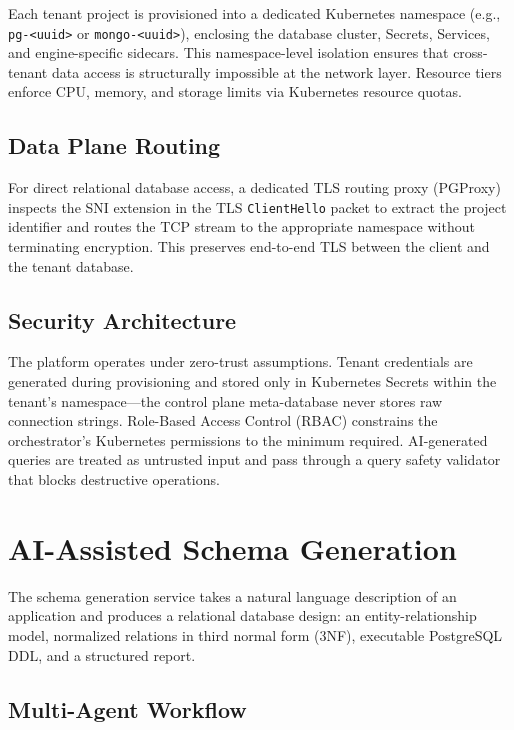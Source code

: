 \documentclass[twoside,twocolumn,10pt]{article}
\begin{document}
Each tenant project is provisioned into a dedicated Kubernetes namespace (e.g., \texttt{pg-<uuid>} or \texttt{mongo-<uuid>}), enclosing the database cluster, Secrets, Services, and engine-specific sidecars. This namespace-level isolation ensures that cross-tenant data access is structurally impossible at the network layer. Resource tiers enforce CPU, memory, and storage limits via Kubernetes resource quotas.

\subsection{Data Plane Routing}

For direct relational database access, a dedicated TLS routing proxy (PGProxy) inspects the SNI extension in the TLS \texttt{ClientHello} packet to extract the project identifier and routes the TCP stream to the appropriate namespace without terminating encryption. This preserves end-to-end TLS between the client and the tenant database.

\subsection{Security Architecture}

The platform operates under zero-trust assumptions. Tenant credentials are generated during provisioning and stored only in Kubernetes Secrets within the tenant's namespace---the control plane meta-database never stores raw connection strings. Role-Based Access Control (RBAC) constrains the orchestrator's Kubernetes permissions to the minimum required. AI-generated queries are treated as untrusted input and pass through a query safety validator that blocks destructive operations.


\section{AI-Assisted Schema Generation}
\fontsize{11}{13}\selectfont

The schema generation service takes a natural language description of an application and produces a relational database design: an entity-relationship model, normalized relations in third normal form (3NF), executable PostgreSQL DDL, and a structured report.

\subsection{Multi-Agent Workflow}
\end{document}
